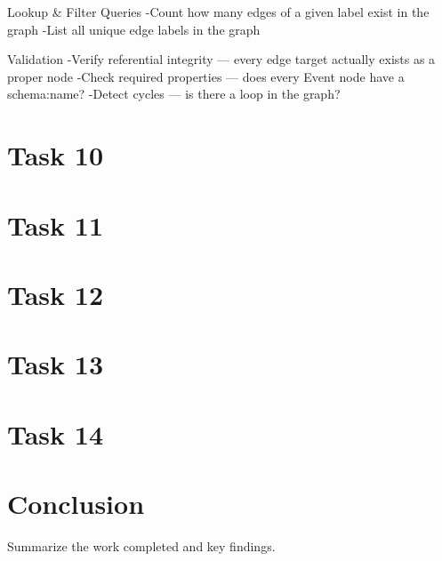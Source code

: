 \documentclass[a4paper,11pt]{article}
\begin{document}
    Lookup & Filter Queries
    -Count how many edges of a given label exist in the graph
    -List all unique edge labels in the graph

    Validation
    -Verify referential integrity — every edge target actually exists as a proper node
    -Check required properties — does every Event node have a schema:name?
    -Detect cycles — is there a loop in the graph?

\section{Task 10}

\section{Task 11}

\section{Task 12}

\section{Task 13}

\section{Task 14}

\section{Conclusion}
Summarize the work completed and key findings.
\end{document}
